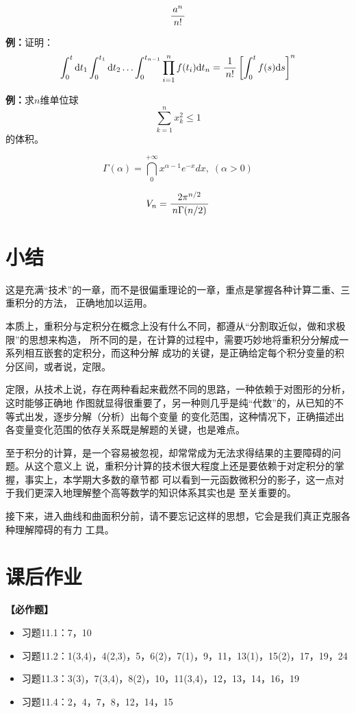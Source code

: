 $$\displaystyle\frac{\,{a^n}\,}{\,{n!}\,}$$

{\bf 例：}证明：
$$\displaystyle\int_0^t\mathrm{d} t_1\displaystyle\int_0^{t_1}\mathrm{d} t_2\ldots
\displaystyle\int_0^{t_{n-1}}\prod\limits_{i=1}^nf(t_i)\mathrm{d} t_n
=\displaystyle\frac{\,{1}\,}{\,{n!}\,}\left[\displaystyle\int_0^tf(s)\mathrm{d} s\right]^n$$

{\bf 例：}求$n$维单位球
$$\sum\limits_{k=1}^nx_k^2\leq 1$$
的体积。

$${\Gamma(\alpha)=\dint_0^{+\infty}x^{\alpha-1}e^{-x}dx,\;(\alpha>0)}$$

$${V_n=\displaystyle\frac{\,{2\pi^{n/2}}\,}{\,{n\Gamma(n/2)}\,}}$$

\section{小结}

这是充满“技术”的一章，而不是很偏重理论的一章，重点是掌握各种计算二重、三重积分的方法，
正确地加以运用。

本质上，重积分与定积分在概念上没有什么不同，都遵从“分割取近似，做和求极限”的思想来构造，
所不同的是，在计算的过程中，需要巧妙地将重积分分解成一系列相互嵌套的定积分，而这种分解
成功的关键，是正确给定每个积分变量的积分区间，或者说，定限。

定限，从技术上说，存在两种看起来截然不同的思路，一种依赖于对图形的分析，这时能够正确地
作图就显得很重要了，另一种则几乎是纯“代数”的，从已知的不等式出发，逐步分解（分析）出每个变量
的变化范围，这种情况下，正确描述出各变量变化范围的依存关系既是解题的关键，也是难点。

至于积分的计算，是一个容易被忽视，却常常成为无法求得结果的主要障碍的问题。从这个意义上
说，重积分计算的技术很大程度上还是要依赖于对定积分的掌握，事实上，本学期大多数的章节都
可以看到一元函数微积分的影子，这一点对于我们更深入地理解整个高等数学的知识体系其实也是
至关重要的。

接下来，进入曲线和曲面积分前，请不要忘记这样的思想，它会是我们真正克服各种理解障碍的有力
工具。

\newpage

\section*{课后作业}

{\bf 【必作题】}

\begin{itemize}
  \setlength{\itemindent}{1cm}
  \item 习题11.1：7，10
  \item 习题11.2：1(3,4)，4(2,3)，5，6(2)，7(1)，9，11，13(1)，15(2)，17，19，24
  \item 习题11.3：3(3)，7(3,4)，8(2)，10，11(3,4)，12，13，14，16，19
  \item 习题11.4：2，4，7，8，12，14，15
\end{itemize}

